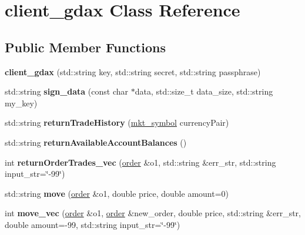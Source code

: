 \hypertarget{classclient__gdax}{}\section{client\+\_\+gdax Class Reference}
\label{classclient__gdax}
\subsection*{Public Member Functions}
\begin{DoxyCompactItemize}
\item 
\mbox{\label{classclient__gdax_a1e4d7c2f08a89acabecc0a7ac1e2ae50}} 
{\bfseries client\+\_\+gdax} (std\+::string key, std\+::string secret, std\+::string passphrase)
\item 
\mbox{\label{classclient__gdax_a202eea2735b0d2c98c859e2bd9e6e584}} 
std\+::string {\bfseries sign\+\_\+data} (const char $\ast$data, std\+::size\+\_\+t data\+\_\+size, std\+::string my\+\_\+key)
\item 
\mbox{\label{classclient__gdax_aac03123e9a85dd08d56ffb94e0f90811}} 
std\+::string {\bfseries return\+Trade\+History} (\mbox{\hyperlink{structmkt__symbol}{mkt\+\_\+symbol}} currency\+Pair)
\item 
\mbox{\label{classclient__gdax_a584e3c9f8da2dd4c90c7111bc9d88e17}} 
std\+::string {\bfseries return\+Available\+Account\+Balances} ()
\item 
\mbox{\label{classclient__gdax_a8983b5020b86571b40e1165facab03cd}} 
int {\bfseries return\+Order\+Trades\+\_\+vec} (\mbox{\hyperlink{structorder}{order}} \&o1, std\+::string \&err\+\_\+str, std\+::string input\+\_\+str=\char`\"{}-\/99\char`\"{})
\item 
\mbox{\label{classclient__gdax_a0e1fe01089c66788d95db9bda0d6fde4}} 
std\+::string {\bfseries move} (\mbox{\hyperlink{structorder}{order}} \&o1, double price, double amount=0)
\item 
\mbox{\label{classclient__gdax_a59642a0c813e5c25e103e6b9c0c4402d}} 
int {\bfseries move\+\_\+vec} (\mbox{\hyperlink{structorder}{order}} \&o1, \mbox{\hyperlink{structorder}{order}} \&new\+\_\+order, double price, std\+::string \&err\+\_\+str, double amount=-\/99, std\+::string input\+\_\+str=\char`\"{}-\/99\char`\"{})

\end{DoxyCompactItemize}
